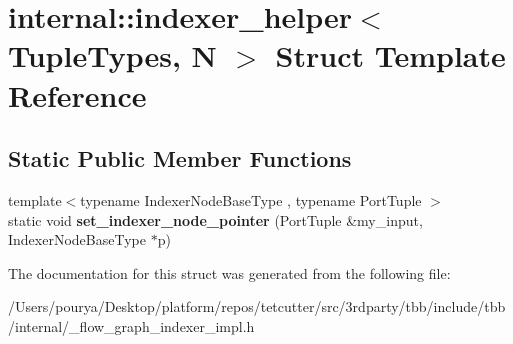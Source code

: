 \hypertarget{structinternal_1_1indexer__helper}{}\section{internal\+:\+:indexer\+\_\+helper$<$ Tuple\+Types, N $>$ Struct Template Reference}
\label{structinternal_1_1indexer__helper}
\subsection*{Static Public Member Functions}
\begin{DoxyCompactItemize}
\item 
\hypertarget{structinternal_1_1indexer__helper_a688963d5ac1db4f5a29c1c14601c0097}{}{\footnotesize template$<$typename Indexer\+Node\+Base\+Type , typename Port\+Tuple $>$ }\\static void {\bfseries set\+\_\+indexer\+\_\+node\+\_\+pointer} (Port\+Tuple \&my\+\_\+input, Indexer\+Node\+Base\+Type $\ast$p)\label{structinternal_1_1indexer__helper_a688963d5ac1db4f5a29c1c14601c0097}

\end{DoxyCompactItemize}


The documentation for this struct was generated from the following file\+:\begin{DoxyCompactItemize}
\item 
/\+Users/pourya/\+Desktop/platform/repos/tetcutter/src/3rdparty/tbb/include/tbb/internal/\+\_\+flow\+\_\+graph\+\_\+indexer\+\_\+impl.\+h\end{DoxyCompactItemize}
